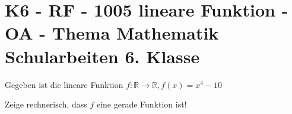 \section{K6 - RF - 1005 lineare Funktion - OA - Thema Mathematik Schularbeiten 6. Klasse}

\begin{beispiel}[K6 - RF]{1} %
			Gegeben ist die lineare Funktion $f\!:\mathbb{R}\rightarrow\mathbb{R}, f(x)=x^4-10$
			
			Zeige rechnerisch, dass $f$ eine gerade Funktion ist!\leer
			
							\end{beispiel}